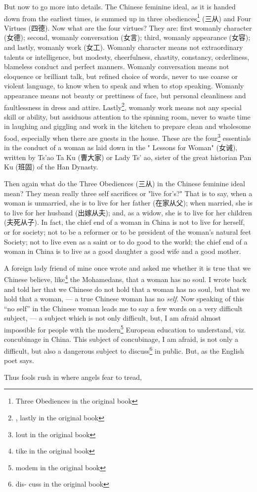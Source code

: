 But now to go more into details.
The Chinese feminine ideal, as it is handed down from the earliest times, is summed up in three obediences\footnote{Three Obediences in the original book} (三从) and Four Virtues (四德). 
Now what are the four virtues?
They are: first womanly character (女德); second, womanly conversation (女言); third, womanly appearance (女容); and lastly, womanly work (女工).
Womanly character means not extraordinary talents or intelligence, but modesty, cheerfulness, chastity, constancy, orderliness, blameless conduct and perfect manners.
Womanly conversation means not eloquence or brilliant talk, but refined choice of words, never to use coarse or violent language, to know when to speak and when to stop speaking.
Womanly appearance means not beauty or prettiness of face, but personal cleanliness and faultlessness in dress and attire.
Lastly\footnote{, lastly in the original book}, womanly work means not any special skill or ability, but assiduous attention to the spinning room, never to waste time in laughing and giggling and work in the kitchen to prepare clean and wholesome food, especially when there are guests in the house.
These are the four\footnote{lout in the original book} essentials in the conduct of a woman as laid down in the " Lessons for Woman" (女诫), written by Ts'ao Ta Ku (曹大家) or Lady Ts' ao, sister of the great historian Pan Ku (班固) of the Han Dynasty.

Then again what do the Three Obediences (三从) in the Chinese feminine ideal mean?
They mean really three self sacrifices or "live for's?"
That is to say, when a woman is unmarried, she is to live for her father (在家从父); when married, she is to live for her husband (出嫁从夫); and, as a widow, she is to live for her children (夫死从子).
In fact, the chief end of a woman in China is not to live for herself, or for society; not to be a reformer or to be president of the woman's natural feet Society; not to live even as a saint or to do good to the world; the chief end of a woman in China is to live as a good daughter a good wife and a good mother.

A foreign lady friend of mine once wrote and asked me whether it is true that we Chinese believe, like\footnote{tike in the original book} the Mohamedans, that a woman has no soul.
I wrote back and told her that we Chinese do not hold that a woman has no soul, but that we hold that a woman, --- a true Chinese woman has no \emph{self}.
Now speaking of this ``no self'' in the Chinese woman leads me to say a few words on a very difficult subject, --- a subject which is not only difficult, but, I am afraid almost impossible for people with the modern\footnote{modem in the original book} European education to understand, viz. concubinage in China.
This subject of concubinage, I am afraid, is not only a difficult, but also a dangerous subject to discuss\footnote{dis- cuss in the original book} in public.
But, as the English poet says.
\begin{center}
     Thus fools rush in where angels fear to tread,
 \end{center}

